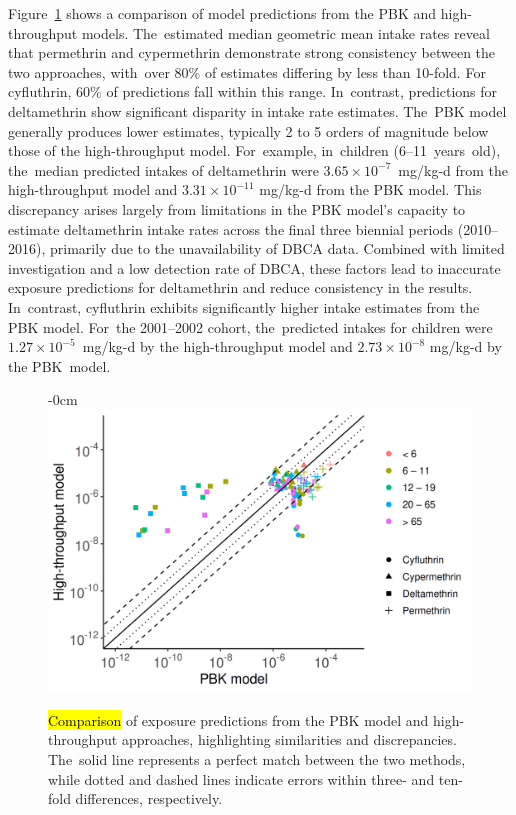 \documentclass[toxics,article,accept,pdftex,moreauthors]{Definitions/mdpi}
\begin{document}
Figure~\ref{fig:fig4} shows a comparison of model predictions from the PBK and
high-throughput models. The~estimated median geometric mean intake rates
reveal that permethrin and cypermethrin demonstrate strong consistency between
the two approaches, with~over 80\% of estimates differing by less than 10-fold.
For cyfluthrin, 60\% of predictions fall within this range. In~contrast,
predictions for deltamethrin show significant disparity in intake rate
estimates. The~PBK model generally produces lower estimates, typically 2 to 5
orders of magnitude below those of the high-throughput model. 
For~example, in~children \mbox{(6--11 years old),} the~median predicted intakes of deltamethrin were
\mbox{\(3.65 \times 10^{-7}\) mg/kg-d} from the high-throughput model and \(3.31
\times 10^{-11}\) mg/kg-d  from the PBK model. This discrepancy
arises largely from limitations in the PBK model’s capacity to estimate
deltamethrin intake rates across the final three biennial periods (2010–2016),
primarily due to the unavailability of DBCA data. Combined with limited
investigation and a low detection rate of DBCA, these factors lead to
inaccurate exposure predictions for deltamethrin and reduce consistency in the
results. In~contrast, cyfluthrin exhibits significantly higher intake estimates
from the PBK model. For~the 2001--2002 cohort, the~predicted intakes for children
were \mbox{\(1.27 \times 10^{-5}\) mg/kg-d} by the high-throughput model and \(2.73
\times 10^{-8}\) mg/kg-d by the PBK~model.
 


\vspace{-6pt}\begin{figure}[H]
\begin{adjustwidth}{-\extralength}{0cm}
~~~~~~~~~~\includegraphics[width=0.87\linewidth]{figures/fig4_comparison}
\hfill
\end{adjustwidth}
\caption{\hl{Comparison} %
 of exposure predictions from the PBK model and
high-throughput approaches, highlighting similarities and discrepancies. The~solid line represents a perfect match between the two methods, while dotted and
dashed lines indicate errors within three- and ten-fold differences,
respectively.\label{fig:fig4}}
\end{figure}
\end{document}
